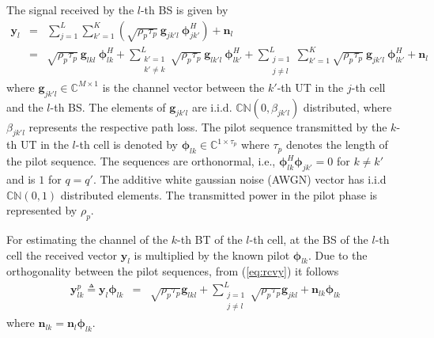 \documentclass[10pt, a4paper, twoside,fleqn]{article}
\begin{document}
The signal received by the $l$-th BS is given by
\begin{eqnarray}\label{eq:rcvy}
	\pmb{y}_{l} &=& \sum_{j=1}^{L} \sum_{k'=1}^{K} \left(\sqrt{\rho_p \tau_p} \ \pmb{g}_{jk'l} \ \pmb{\phi}^H_{jk'}\right)
        		    +  \pmb{n}_{l} \nonumber \\                    
    			   &=& \sqrt{\rho_p \tau_p} \ \pmb{g}_{lkl} \ \pmb{\phi}^H_{lk}
        			+  \sum_{\substack{k'=1 \\ k' \neq k}}^{L} \sqrt{\rho_p \tau_p} \ \pmb{g}_{lk'l} \ \pmb{\phi}^H_{lk'}
        		    +  \sum_{\substack{j=1 \\ j \neq l}}^{L} \sum_{k'=1}^{K} \sqrt{\rho_p \tau_p} \
                       \pmb{g}_{jk'l} \ \pmb{\phi}^H_{lk'}
    			    +  \pmb{n}_{l}
\end{eqnarray}
where $\pmb{g}_{jk'l} \in {\mathbb C}^{M \times 1}$ is the channel vector between the $k'$-th UT in the $j$-th cell and the $l$-th BS. The elements of $\pmb{g}_{jk'l}$ are i.i.d. ${\mathbb C}{\mathbb N}(0, \beta_{jk'l})$ distributed, where $\beta_{jk'l}$ represents the respective path loss. The pilot sequence transmitted by the $k$-th UT in the $l$-th cell is denoted by $\pmb{\phi}_{lk} \in {\mathbb C}^{1 \times \tau_p}$ where $\tau_p$ denotes the length of the pilot sequence. The sequences are orthonormal, i.e., $\pmb{\phi}_{lk}^H \pmb{\phi}_{jk'} = 0$ for  $k \ne k'$ and is $1$ for $q=q'$. The additive white gaussian noise (AWGN) vector has i.i.d ${\mathbb C}{\mathbb N}(0,1)$ distributed elements. The transmitted power in the pilot phase is represented by $\rho_p$.

For estimating the channel of the $k$-th BT of the $l$-th cell, at the BS of the $l$-th cell the received vector $\pmb{y}_{l}$ is multiplied by the known pilot $\pmb{\phi}_{lk}$. Due to the orthogonality between the pilot sequences, from (\ref{eq:rcvy}) it follows
\begin{eqnarray}
	\pmb{y}_{lk}^{p} \triangleq \pmb{y}_{l} \pmb{\phi}_{lk}
                          &=&     \sqrt{\rho_p\tau_p}\pmb{g}_{lkl}
                           +      \sum_{\substack{j=1 \\ j \neq l}}^{L} \sqrt{\rho_p\tau_p}\pmb{g}_{jkl}
             			   +      \pmb{n}_{lk}\pmb{\phi}_{lk}
\end{eqnarray}
where $\pmb{n}_{lk} = \pmb{n}_{l}\pmb{\phi}_{lk}$.
\end{document}
